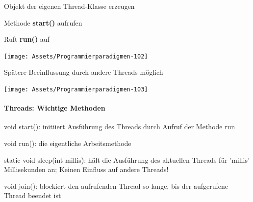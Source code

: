 \documentclass[10pt]{article}
\begin{document}
  \begin{itemize*}
    \item Objekt der eigenen Thread-Klasse erzeugen
    \item Methode \textbf{start()} aufrufen
    \begin{itemize*}
      \item Ruft \textbf{run()} auf
    \end{itemize*}
    \begin{center}
      \centering
      \texttt{[image: Assets/Programmierparadigmen-102]}
    \end{center}
    \item Spätere Beeinflussung durch andere Threads möglich
    \begin{center}
      \centering
      \texttt{[image: Assets/Programmierparadigmen-103]}
    \end{center}
  \end{itemize*}
  
  
  \paragraph{Threads: Wichtige Methoden}
  
  \begin{itemize*}
    \item void start(): initiiert Ausführung des Threads durch Aufruf der Methode run
    \item void run(): die eigentliche Arbeitsmethode
    \item static void sleep(int millis): hält die Ausführung des aktuellen Threads für 'millis' Millisekunden an; Keinen Einfluss auf andere Threads!
    \item void join(): blockiert den aufrufenden Thread so lange, bis der aufgerufene Thread beendet ist
  \end{itemize*}
  
\end{document}
